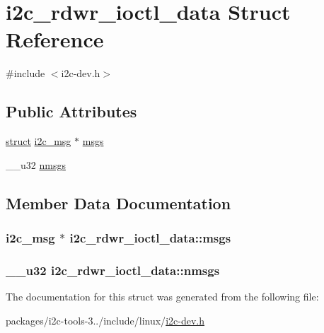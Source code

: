\hypertarget{structi2c__rdwr__ioctl__data}{}\section{i2c\+\_\+rdwr\+\_\+ioctl\+\_\+data Struct Reference}
\label{structi2c__rdwr__ioctl__data}


{\ttfamily \#include $<$i2c-\/dev.\+h$>$}

\subsection*{Public Attributes}
\begin{DoxyCompactItemize}
\item 
\hyperlink{gen__mat5files_8m_aa5a86657308844fba3fe81ef5286ca5f}{struct} \hyperlink{structi2c__msg}{i2c\+\_\+msg} $\ast$ \hyperlink{structi2c__rdwr__ioctl__data_abfc9667911b3aa9920dd005ef902ac69}{msgs}
\item 
\+\_\+\+\_\+u32 \hyperlink{structi2c__rdwr__ioctl__data_aab635d05b219aba0508889f7f23170e3}{nmsgs}
\end{DoxyCompactItemize}


\subsection{Member Data Documentation}
\hypertarget{structi2c__rdwr__ioctl__data_abfc9667911b3aa9920dd005ef902ac69}{}
\subsubsection[{msgs}]{ {\bf i2c\+\_\+msg} $\ast$ i2c\+\_\+rdwr\+\_\+ioctl\+\_\+data\+::msgs}\label{structi2c__rdwr__ioctl__data_abfc9667911b3aa9920dd005ef902ac69}
\hypertarget{structi2c__rdwr__ioctl__data_aab635d05b219aba0508889f7f23170e3}{}
\subsubsection[{nmsgs}]{\setlength{\rightskip}{0pt plus 5cm}\+\_\+\+\_\+u32 i2c\+\_\+rdwr\+\_\+ioctl\+\_\+data\+::nmsgs}\label{structi2c__rdwr__ioctl__data_aab635d05b219aba0508889f7f23170e3}


The documentation for this struct was generated from the following file\+:\begin{DoxyCompactItemize}
\item 
packages/i2c-\/tools-\/3../include/linux/\hyperlink{i2c-tools-3_81_81_2include_2linux_2i2c-dev_8h}{i2c-\/dev.\+h}\end{DoxyCompactItemize}
